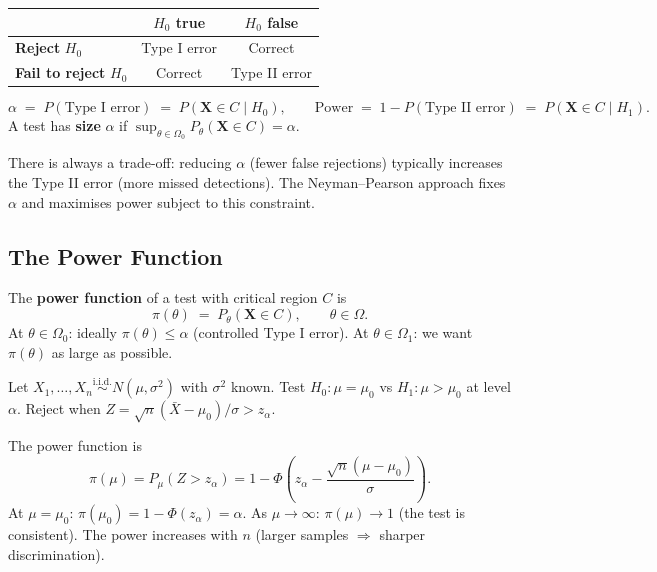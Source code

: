 \documentclass[11pt, a4paper]{article}
\newcommand{\iid}{\overset{\text{i.i.d.}}{\sim}}
\begin{document}
\begin{defbox}
\begin{center}
\renewcommand{\arraystretch}{1.3}
\begin{tabular}{lcc}
\toprule
 & $H_0$ \textbf{true} & $H_0$ \textbf{false} \\
\midrule
\textbf{Reject} $H_0$ & Type I error & Correct \\
\textbf{Fail to reject} $H_0$ & Correct & Type II error \\
\bottomrule
\end{tabular}
\end{center}
\vspace{4pt}
\[
  \alpha \;=\; P(\text{Type I error}) \;=\; P(\mathbf{X} \in C \mid H_0),
  \qquad
  \text{Power} \;=\; 1 - P(\text{Type II error}) \;=\; P(\mathbf{X} \in C \mid H_1).
\]
A test has \textbf{size} $\alpha$ if $\sup_{\theta \in \Omega_0} P_\theta(\mathbf{X} \in C) = \alpha$.
\end{defbox}

\begin{warnbox}[Remark]
There is always a trade-off: reducing $\alpha$ (fewer false rejections) typically increases the Type II error (more missed detections). The Neyman--Pearson approach fixes $\alpha$ and maximises power subject to this constraint.
\end{warnbox}

\subsection*{The Power Function}

\begin{defbox}
The \textbf{power function} of a test with critical region $C$ is
\[
  \pi(\theta) \;=\; P_\theta(\mathbf{X} \in C), \qquad \theta \in \Omega.
\]
At $\theta \in \Omega_0$: ideally $\pi(\theta) \leq \alpha$ (controlled Type I error). At $\theta \in \Omega_1$: we want $\pi(\theta)$ as large as possible.
\end{defbox}

\begin{exbox}
Let $X_1,\ldots,X_n \iid N(\mu, \sigma^2)$ with $\sigma^2$ known. Test $H_0\colon \mu = \mu_0$ vs $H_1\colon \mu > \mu_0$ at level $\alpha$. Reject when $Z = \sqrt{n}(\bar{X} - \mu_0)/\sigma > z_\alpha$.

The power function is
\[
  \pi(\mu) = P_\mu(Z > z_\alpha)
  = 1 - \Phi\!\left(z_\alpha - \frac{\sqrt{n}(\mu - \mu_0)}{\sigma}\right).
\]
At $\mu = \mu_0$: $\pi(\mu_0) = 1 - \Phi(z_\alpha) = \alpha$. As $\mu \to \infty$: $\pi(\mu) \to 1$ (the test is consistent). The power increases with $n$ (larger samples $\Rightarrow$ sharper discrimination).
\end{exbox}
\end{document}
